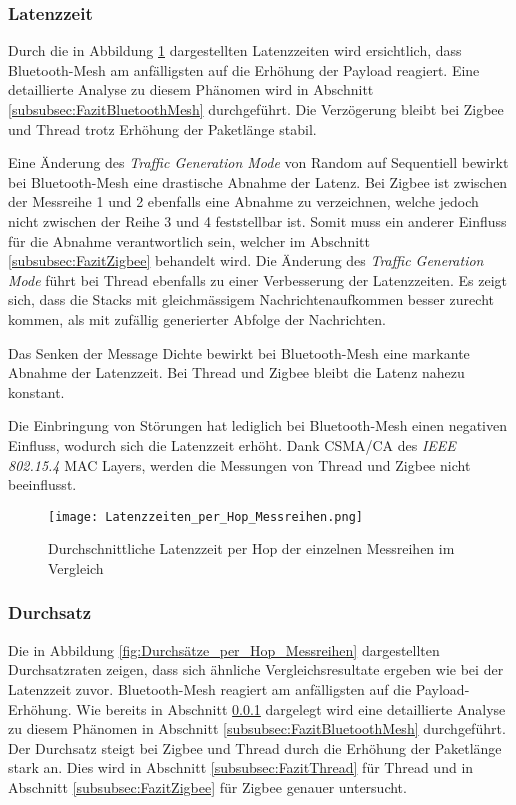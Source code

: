 \subsubsection{Latenzzeit}\label{subsec:VergleichLatenzzeitMessreihen}
Durch die in Abbildung \ref{fig:Latenzzeiten_per_Hop_Messreihen} dargestellten Latenzzeiten wird ersichtlich, dass Bluetooth-Mesh am anfälligsten auf die Erhöhung der Payload reagiert. Eine detaillierte Analyse zu diesem Phänomen wird in Abschnitt \ref{subsubsec:FazitBluetoothMesh} durchgeführt. Die Verzögerung bleibt bei Zigbee und Thread trotz Erhöhung der Paketlänge stabil.

Eine Änderung des \textit{Traffic Generation Mode} von Random auf Sequentiell bewirkt bei Bluetooth-Mesh eine drastische Abnahme der Latenz. Bei Zigbee ist zwischen der Messreihe 1 und 2 ebenfalls eine Abnahme zu verzeichnen, welche jedoch nicht zwischen der Reihe 3 und 4 feststellbar ist. Somit muss ein anderer Einfluss für die Abnahme verantwortlich sein, welcher im Abschnitt \ref{subsubsec:FazitZigbee} behandelt wird.
Die Änderung des \textit{Traffic Generation Mode} führt bei Thread ebenfalls zu einer Verbesserung der Latenzzeiten.
Es zeigt sich, dass die Stacks mit gleichmässigem Nachrichtenaufkommen besser zurecht kommen, als mit zufällig generierter Abfolge der Nachrichten.

Das Senken der Message Dichte bewirkt bei Bluetooth-Mesh eine markante Abnahme der Latenzzeit.
Bei Thread und Zigbee bleibt die Latenz nahezu konstant.
 
Die Einbringung von Störungen hat lediglich bei Bluetooth-Mesh einen negativen Einfluss, wodurch sich die Latenzzeit erhöht.
Dank CSMA\slash CA des \textit{IEEE 802.15.4} MAC Layers, werden die Messungen von Thread und Zigbee nicht beeinflusst.

\begin{figure}[H]
	\centering
	\texttt{[image: Latenzzeiten\_per\_Hop\_Messreihen.png]}
	\caption{Durchschnittliche Latenzzeit per Hop der einzelnen Messreihen im Vergleich}\label{fig:Latenzzeiten_per_Hop_Messreihen}
\end{figure}

\subsubsection{Durchsatz}\label{subsec:VergleichDurchsatzMessreihen}

Die in Abbildung \ref{fig:Durchsätze_per_Hop_Messreihen} dargestellten Durchsatzraten zeigen, dass sich ähnliche Vergleichsresultate ergeben wie bei der Latenzzeit zuvor.
Bluetooth-Mesh reagiert am anfälligsten auf die Payload-Erhöhung. Wie bereits in Abschnitt \ref{subsec:VergleichLatenzzeitMessreihen} dargelegt wird eine detaillierte Analyse zu diesem Phänomen in Abschnitt \ref{subsubsec:FazitBluetoothMesh} durchgeführt. Der Durchsatz steigt bei Zigbee und Thread durch die Erhöhung der Paketlänge stark an. Dies wird in Abschnitt \ref{subsubsec:FazitThread} für Thread und in Abschnitt \ref{subsubsec:FazitZigbee} für Zigbee genauer untersucht.

